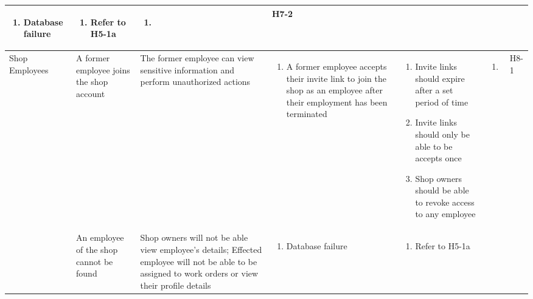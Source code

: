 \documentclass{article}
\begin{document}
\begin{landscape}
\begin{longtable}{|p{}|p{}|p{}|p{}|p{}|p{}|p{}|}
\begin{enumerate}[label=\alph*., leftmargin=*]
			   \item Database failure
		   \end{enumerate}
		 & \begin{enumerate}[label=\alph*., leftmargin=*]
			   \item Refer to H5-1a
		   \end{enumerate}
		 & \begin{enumerate}[label=\alph*., leftmargin=*]
			   \item
		   \end{enumerate}
		 & H7-2                                                                                                         \\
		\hline
		\multirow{2}{*}{Shop Employees}
		 & A former employee joins the shop account
		 & The former employee can view sensitive information and perform unauthorized actions
		 & \begin{enumerate}[label=\alph*., leftmargin=*]
			   \item A former employee accepts their invite link to join the shop as an employee after their employment
			         has been terminated
		   \end{enumerate}
		 & \begin{enumerate}[label=\alph*., leftmargin=*]
			   \item Invite links should expire after a set period of time
			   \item Invite links should only be able to be accepts once
			   \item Shop owners should be able to revoke access to any employee
		   \end{enumerate}
		 & \begin{enumerate}[label=\alph*., leftmargin=*]
			   \item
		   \end{enumerate}
		 & H8-1                                                                                                         \\
		\cline{2-7}
		~
		 & An employee of the shop cannot be found
		 & Shop owners will not be able view employee's details; Effected employee will not be able to be
		assigned to work orders or view their profile details
		 & \begin{enumerate}[label=\alph*., leftmargin=*]
			   \item Database failure
		   \end{enumerate}
		 & \begin{enumerate}[label=\alph*., leftmargin=*]
			   \item Refer to H5-1a

\end{enumerate}
\end{longtable}
\end{landscape}
\end{document}
